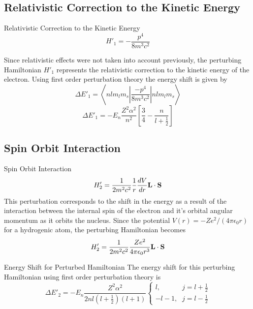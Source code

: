 \documentclass[aspectratio=1610,xcolor=dvipsnames,t]{beamer}
\begin{document}
	\subsection{Relativistic Correction to the Kinetic Energy}
    \begin{frame}{Relativistic Correction to the Kinetic Energy} 
	\begin{equation}
		H'_1 = - \frac{p^4}{8m^3c^2}
	\end{equation}

    Since relativistic effects were not taken into account previously, the 
    perturbing Hamiltonian $H'_1$ represents the relativistic correction
    to the kinetic energy of the electron.
    Using first order perturbation theory the energy shift is given by
    \begin{equation} 
        \Delta E'_1 = \left \langle nl m_l m_s 
                        \left|
                            \frac{-p^4}{8m^3 c^2} 
                        \right|
                      nl m_l m_s \right \rangle 
    \end{equation}
    \begin{equation}
        \Delta E'_1 = -E_n \frac{Z^2 \alpha^2}{n^2} 
                        \left[ \frac{3}{4}  - \frac{n}{l + \frac{1}{2}} \right]
    \end{equation}
    \end{frame} 

	\subsection{Spin Orbit Interaction}
    \begin{frame}{Spin Orbit Interaction} 
	\begin{equation}
		H'_2 = \frac{1}{2m^2c^2} \frac{1}{r} \frac{dV}{dr} {\bf L} \cdot {\bf S} 
	\end{equation}
    This perturbation corresponds to the shift in the energy as a result of the interaction
    between the internal spin of the electron and it's orbital angular momentum as it
    orbits the nucleus. Since the potential $V(r) = -Ze^2/(4 \pi \epsilon_0 r)$ for
    a hydrogenic atom, the perturbing Hamiltonian becomes
    \begin{equation}
        H'_2 = \frac{1}{2m^2c^2} \frac{Ze^2}{4\pi \epsilon_0 r^3} {\bf L} \cdot {\bf S}
    \end{equation}
    \end{frame} 

    \begin{frame}{Energy Shift for Perturbed Hamiltonian} 
    The energy shift for this perturbing Hamiltonian using first order perturbation theory is
    \begin{equation}
        \Delta E'_2 = -E_n \frac{Z^2 \alpha^2}{2nl(l + \frac{1}{2})(l + 1)}
        \left\{
            \begin{array}{ll}
                l       \mbox{,} &  j = l + \frac{1}{2} \\
                -l - 1  \mbox{,} &  j = l - \frac{1}{2}
            \end{array}
        \right.
    \end{equation}
    \end{frame} 
\end{document}
